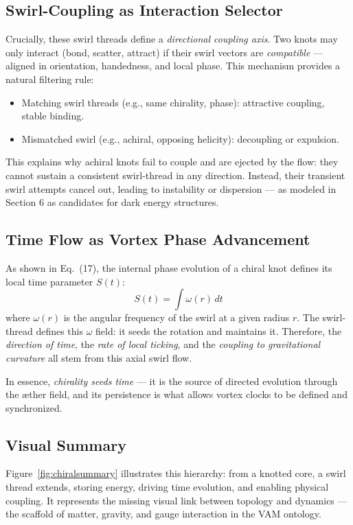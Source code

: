 \documentclass[preprint]{revtex4-2}
\begin{document}
    \subsection{Swirl-Coupling as Interaction Selector}

    Crucially, these swirl threads define a \textit{directional coupling axis}. Two knots may only interact (bond, scatter, attract) if their swirl vectors are \textit{compatible} — aligned in orientation, handedness, and local phase. This mechanism provides a natural filtering rule:
    \begin{itemize}
        \item Matching swirl threads (e.g., same chirality, phase): attractive coupling, stable binding.
        \item Mismatched swirl (e.g., achiral, opposing helicity): decoupling or expulsion.
    \end{itemize}
    This explains why achiral knots fail to couple and are ejected by the flow: they cannot sustain a consistent swirl-thread in any direction. Instead, their transient swirl attempts cancel out, leading to instability or dispersion — as modeled in Section 6 as candidates for dark energy structures.

    \subsection{Time Flow as Vortex Phase Advancement}

    As shown in Eq.~(17), the internal phase evolution of a chiral knot defines its local time parameter $S(t)$:
    \[
        S(t) = \int \omega(r) \, dt
    \]
    where $\omega(r)$ is the angular frequency of the swirl at a given radius $r$. The swirl-thread defines this $\omega$ field: it seeds the rotation and maintains it. Therefore, the \textit{direction of time}, the \textit{rate of local ticking}, and the \textit{coupling to gravitational curvature} all stem from this axial swirl flow.

    In essence, \textit{chirality seeds time} — it is the source of directed evolution through the æther field, and its persistence is what allows vortex clocks to be defined and synchronized.

    \subsection{Visual Summary}

    Figure~\ref{fig:chiralsummary} illustrates this hierarchy: from a knotted core, a swirl thread extends, storing energy, driving time evolution, and enabling physical coupling. It represents the missing visual link between topology and dynamics — the scaffold of matter, gravity, and gauge interaction in the VAM ontology.
\end{document}
